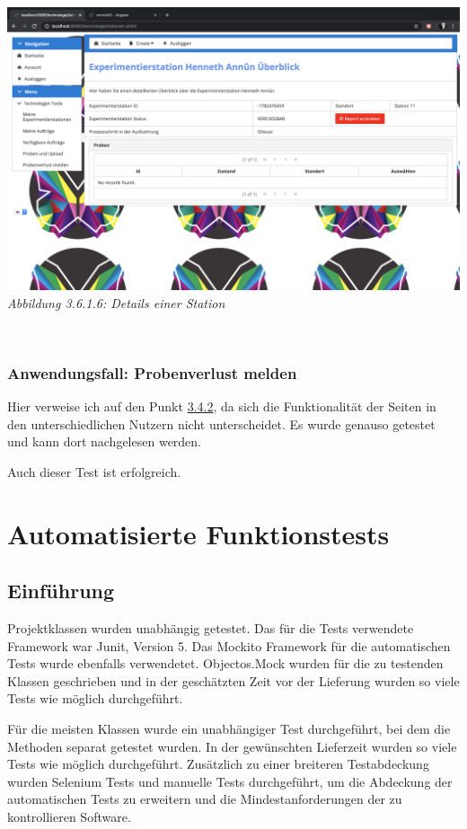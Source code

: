 \documentclass[enabledeprecatedfontcommands,fontsize=12pt,paper=a4,twoside]{scrartcl}
\begin{document}
 \hypertarget{sc3.6.1.6}{
\includegraphics[width=1\textwidth]{Screenshots/3616.png}
\textit{Abbildung 3.6.1.6: Details einer Station}
} \\


\subsubsection{Anwendungsfall: Probenverlust melden}

Hier verweise ich auf den Punkt \hyperlink{3.4.2}{3.4.2}, da sich die Funktionalität der Seiten in den unterschiedlichen Nutzern nicht unterscheidet. Es wurde genauso getestet und kann dort nachgelesen werden.

Auch dieser Test ist erfolgreich.


\newpage
\section{Automatisierte Funktionstests}

\subsection{Einführung}

Projektklassen wurden unabhängig getestet. Das für die Tests verwendete
Framework war Junit, Version 5. Das Mockito Framework für die automatischen
Tests wurde ebenfalls verwendetet. Objectos.Mock wurden für die zu testenden
Klassen geschrieben und in der geschätzten Zeit vor der Lieferung wurden so
viele Tests wie möglich durchgeführt.

Für die meisten Klassen wurde ein unabhängiger Test durchgeführt, bei dem die
Methoden separat getestet wurden. In der gewünschten Lieferzeit wurden so viele
Tests wie möglich durchgeführt. Zusätzlich zu einer breiteren Testabdeckung
wurden Selenium Tests und manuelle Tests durchgeführt, um die Abdeckung der
automatischen Tests zu erweitern und die Mindestanforderungen der zu
kontrollieren Software.
\end{document}
